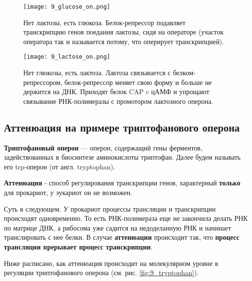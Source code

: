 \begin{minipage}{.49\textwidth}
    \begin{figure}[H]
        \centering
        \texttt{[image: 9\_glucose\_on.png]}
        \label{fig:9_glucose_on}
        \caption{Нет лактозы, есть глюкоза. Белок-репрессор подавляет транскрипцию генов поедания лактозы, сидя на операторе (участок оператора так и называется потому, что оперирует транскрипцией).}
    \end{figure}
\end{minipage}
\begin{minipage}{.49\textwidth}
   \begin{figure}[H]
        \centering
        \texttt{[image: 9\_lactose\_on.png]}
        \label{fig:9_lactose_on}
        \caption{Нет глюкозы, есть лактоза. Лактоза связывается с белком-репрессором, белок-репрессор меняет свою форму и больше не держится на ДНК. Приходят белок CAP c цАМФ и упрощают связывание РНК-полимеразы с промотором лактозного оперона.}
    \end{figure}
\end{minipage}

\subsection{Аттенюация на примере 
триптофанового оперона}

\textbf{Триптофановый оперон} — оперон, содержащий гены ферментов, задействованных в биосинтезе аминокислоты триптофан. Далее будем называть его trp-оперон (от англ. tryptophan). 

\textbf{Аттенюация} - способ регулирования транскрипции генов, характерный \textbf{только} для прокариот, у эукариот он не возможен. 

Суть в следующем. У прокариот процессы трансляции и транскрипции происходят одновременно. То есть РНК-полимераза еще не закончила делать РНК по матрице ДНК, а рибосома уже садится на недоделанную РНК и начинает транслировать с нее белки. В случае \textbf{аттенюации} происходит так, что \textbf{процесс трансляции прерывает процесс транскрипции}.

Ниже расписано, как аттенюация происходит на молекулярном уровне в регуляции триптофанового оперона (см. рис. \ref{fig:9_tryptophan}).

